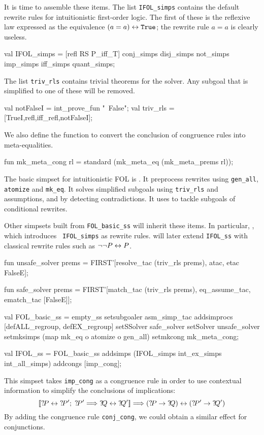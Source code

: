 It is time to assemble these items.  The list \texttt{IFOL_simps} contains the
default rewrite rules for intuitionistic first-order logic.  The first of
these is the reflexive law expressed as the equivalence
$(a=a)\leftrightarrow\texttt{True}$; the rewrite rule $a=a$ is clearly useless.
\begin{ttbox}
val IFOL_simps =
   [refl RS P_iff_T] \at conj_simps \at disj_simps \at not_simps \at 
    imp_simps \at iff_simps \at quant_simps;
\end{ttbox}
The list \texttt{triv_rls} contains trivial theorems for the solver.  Any
subgoal that is simplified to one of these will be removed.
\begin{ttbox}
val notFalseI = int_prove_fun "~False";
val triv_rls = [TrueI,refl,iff_refl,notFalseI];
\end{ttbox}
We also define the function  to convert the conclusion
of congruence rules into meta-equalities.
\begin{ttbox}
fun mk_meta_cong rl = standard (mk_meta_eq (mk_meta_prems rl));
\end{ttbox}
%
The basic simpset for intuitionistic FOL is .  It
preprocess rewrites using 
{\tt gen_all}, \texttt{atomize} and \texttt{mk_eq}.
It solves simplified subgoals using \texttt{triv_rls} and assumptions, and by
detecting contradictions.  It uses  to tackle subgoals
of conditional rewrites.

Other simpsets built from \texttt{FOL_basic_ss} will inherit these items.
In particular, , which introduces {\tt
  IFOL_simps} as rewrite rules.   will later
extend \texttt{IFOL_ss} with classical rewrite rules such as $\neg\neg
P\leftrightarrow P$.
\begin{ttbox}
fun unsafe_solver prems = FIRST'[resolve_tac (triv_rls {\at} prems),
                                 atac, etac FalseE];

fun safe_solver prems = FIRST'[match_tac (triv_rls {\at} prems),
                               eq_assume_tac, ematch_tac [FalseE]];

val FOL_basic_ss =
      empty_ss setsubgoaler asm_simp_tac
               addsimprocs [defALL_regroup, defEX_regroup]
               setSSolver   safe_solver
               setSolver  unsafe_solver
               setmksimps (map mk_eq o atomize o gen_all)
               setmkcong mk_meta_cong;

val IFOL_ss = 
      FOL_basic_ss addsimps (IFOL_simps {\at} 
                             int_ex_simps {\at} int_all_simps)
                   addcongs [imp_cong];
\end{ttbox}
This simpset takes \texttt{imp_cong} as a congruence rule in order to use
contextual information to simplify the conclusions of implications:
\[ \List{\Var{P}\bimp\Var{P'};\; \Var{P'} \Imp \Var{Q}\bimp\Var{Q'}} \Imp
   (\Var{P}\imp\Var{Q}) \bimp (\Var{P'}\imp\Var{Q'})
\]
By adding the congruence rule \texttt{conj_cong}, we could obtain a similar
effect for conjunctions.


